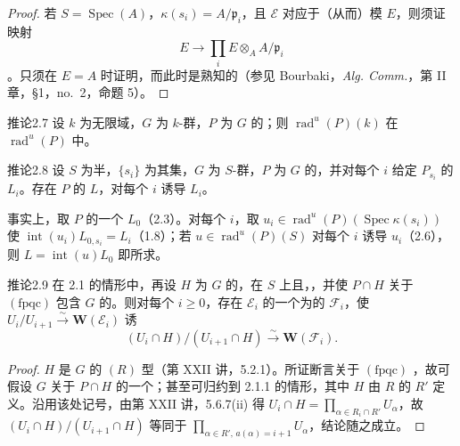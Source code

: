 \begin{proof}
若 $S=\operatorname{Spec}(A)$，$\kappa(s_i)=A/\mathfrak p_i$，且 $\mathcal E$ 对应于（从而）模 $E$，则须证映射
\[E\longrightarrow\prod_i E\otimes_A A/\mathfrak p_i\]
。只须在 $E=A$ 时证明，而此时是熟知的（参见 Bourbaki，\textit{Alg. Comm.}，第 II 章，§1，no.~2，命题 5）。
\end{proof}
\begin{SGAresult}{推论}{2.7}
设 $k$ 为无限域，$G$ 为 $k$-群，$P$ 为 $G$ 的；则 $\operatorname{rad}^{u}(P)(k)$ 在 $\operatorname{rad}^{u}(P)$ 中。
\end{SGAresult}
\begin{SGAresult}{推论}{2.8}
设 $S$ 为半，$\{s_i\}$ 为其集，$G$ 为 $S$-群，$P$ 为 $G$ 的，并对每个 $i$ 给定 $P_{s_i}$ 的 $L_i$。存在 $P$ 的 $L$，对每个 $i$ 诱导 $L_i$。
\end{SGAresult}
事实上，取 $P$ 的一个 $L_0$（2.3）。对每个 $i$，取 $u_i\in\operatorname{rad}^{u}(P)(\operatorname{Spec}\kappa(s_i))$ 使 $\operatorname{int}(u_i)L_{0,s_i}=L_i$（1.8）；若 $u\in\operatorname{rad}^{u}(P)(S)$ 对每个 $i$ 诱导 $u_i$（2.6），则 $L=\operatorname{int}(u)L_0$ 即所求。
\begin{SGAresult}{推论}{2.9}
在 2.1 的情形中，再设 $H$ 为 $G$ 的，在 $S$ 上且，，并使 $P\cap H$ 关于 $(\mathrm{fpqc})$ 包含 $G$ 的。则对每个 $i\ge0$，存在 $\mathcal E_i$ 的一个为的 $\mathcal F_i$，使 $U_i/U_{i+1}\xrightarrow{\sim}\mathbf W(\mathcal E_i)$ 诱
\[(U_i\cap H)/(U_{i+1}\cap H)\xrightarrow{\sim}\mathbf W(\mathcal F_i).\]
\end{SGAresult}
\begin{proof}
$H$ 是 $G$ 的 $(R)$ 型（第 XXII 讲，5.2.1）。所证断言关于 $(\mathrm{fpqc})$ ，故可假设 $G$ 关于 $P\cap H$ 的一个；甚至可归约到 2.1.1 的情形，其中 $H$ 由 $R$ 的 $R'$ 定义。沿用该处记号，由第 XXII 讲，5.6.7(ii) 得 $U_i\cap H=\prod_{\alpha\in R_i\cap R'}U_\alpha$，故 $(U_i\cap H)/(U_{i+1}\cap H)$ 等同于 $\prod_{\alpha\in R',\,a(\alpha)=i+1}U_\alpha$，结论随之成立。
\end{proof}
